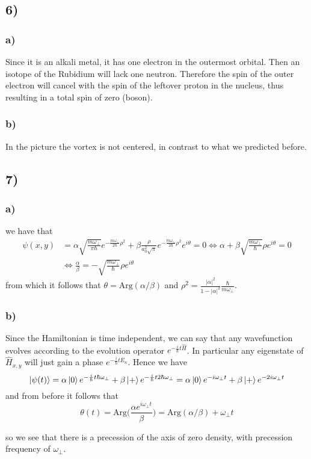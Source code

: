 \documentclass[10pt,a4paper]{book}
\begin{document}
\subsection*{6)}

\subsubsection*{a)}

Since it is an alkali metal, it has one electron in the outermost orbital. Then an isotope of the Rubidium will lack one neutron. Therefore the spin of the outer electron will cancel with the spin of the leftover proton in the nucleus, thus resulting in a total spin of zero (boson).

\subsubsection*{b)}
In the picture the vortex is not centered, in contrast to what we predicted before. 

\subsection*{7)}

\subsubsection*{a)}
we have that 
\begin{align*}
\psi(x,y)&=\alpha \sqrt{\frac{m\omega_{\perp}}{\pi \hbar}}e^{-\frac{m\omega_{\perp}}{2\hbar}\rho^2}+\beta\frac{\rho}{a_0^2\sqrt{\pi}}e^{-\frac{m\omega_{\perp}}{2\hbar}\rho^2}e^{i\theta}=0\Leftrightarrow 
\alpha+\beta\sqrt{\frac{m\omega_{\perp}}{\hbar}}\rho e^{i\theta}=0\\
&\Leftrightarrow \frac{\alpha}{\beta}=-\sqrt{\frac{m\omega_{\perp}}{\hbar}}\rho e^{i\theta}
\end{align*}
from which it follows that $\theta=\text{Arg}(\alpha/\beta)$ and $\rho^2=\frac{|\alpha|^2}{1-|\alpha|^2}\frac{\hbar}{m\omega_{\perp}}$.

\subsubsection*{b)}
Since the Hamiltonian is time independent, we can say that any wavefunction evolves according to the evolution operator $e^{-\frac{i}{\hbar}t\hat{H}}$. In particular any eigenstate of $\hat{H}_{x,y}$ will just gain a phase $e^{-\frac{i}{\hbar}tE_n}$. Hence we have
$$\ket{\psi(t)}=\alpha\ket{0}e^{-\frac{i}{\hbar}t\hbar\omega_{\perp}}+\beta\ket{+}e^{-\frac{i}{\hbar}t2\hbar \omega_{\perp}}=\alpha\ket{0}e^{-i\omega_{\perp}t}+\beta\ket{+}e^{-2i\omega_{\perp}t}$$
and from before it follows that 
$$\theta(t)=\text{Arg}\bigg(\frac{\alpha e^{i\omega_{\perp} t}}{\beta}\bigg)=\text{Arg}(\alpha/\beta)+\omega_{\perp}t$$


so we see that there is a precession of the axis of zero density, with precession frequency of $\omega_{\perp}$. 
\end{document}
